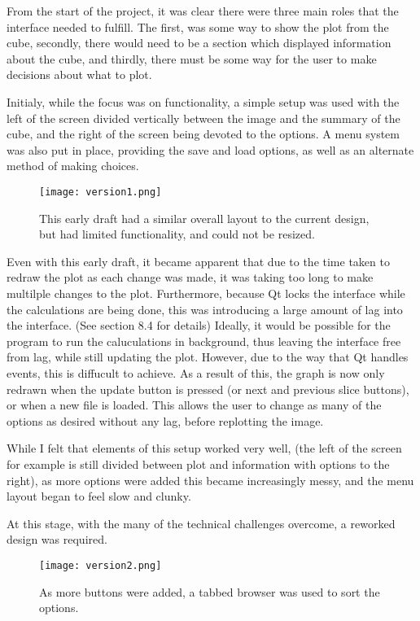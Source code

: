 \documentclass[whitecover]{MO_report}
\begin{document}
From the start of the project, it was clear there were three main roles that
the interface needed to fulfill. The first, was some way to show the plot from
the cube, secondly, there would need to be a section which displayed information
about the cube, and thirdly, there must be some way for the user to make
decisions about what to plot.

Initialy, while the focus was on functionality, a simple setup was used with
the left of the screen divided vertically between the image and the summary of
the cube, and the right of the screen being devoted to the options.
A menu system was also put in place, providing the save and load options, as
well as an alternate method of making choices.

\begin{figure}[ht!]
\centering
\texttt{[image: version1.png]}
\caption{This early draft had a similar overall layout to the current design,
but had limited functionality, and could not be resized.}
\label{overflow}
\end{figure}

Even with this early draft, it became apparent that due to the time taken to
redraw the plot as each change was made, it was taking too long to make
multilple changes to the plot. Furthermore, because Qt locks the interface
while the calculations are being done, this was introducing a large amount of
lag into the interface. (See section 8.4 for details) Ideally, it would be
possible for the program to run the caluculations in background, thus leaving
the interface free from lag, while still updating the plot. However, due to the
way that Qt handles events, this is diffucult to achieve. As a result of this,
the graph is now only redrawn when the update button is pressed (or next and
previous slice buttons), or when a new file is loaded. This allows the user to
change as many of the options as desired without any lag, before replotting the
image.

While I felt that elements of this setup worked very well, (the left of the
screen for example is still divided between plot and information with options
to the right), as more options were added this became increasingly messy, and
the menu layout began to feel slow and clunky.

At this stage, with the many of the technical challenges overcome, a
reworked design was required.

\begin{figure}[ht!]
\centering
\texttt{[image: version2.png]}
\caption{As more buttons were added, a tabbed browser was used to sort the
options.}
\label{overflow}
\end{figure}
\end{document}
